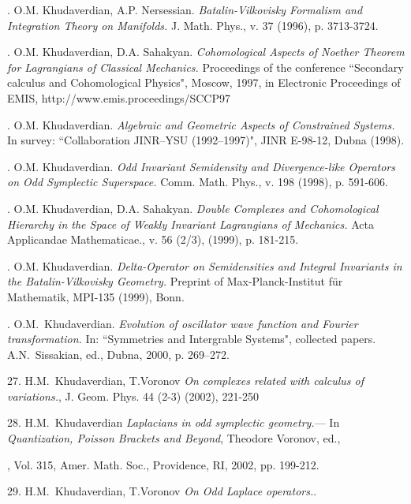 \documentclass[12pt]{article}
\begin{document}
. O.M. Khudaverdian, A.P. Nersessian.
 {\it Batalin-Vilkovisky Formalism and
  Integration Theory on Manifolds.}
  J. Math. Phys., v. 37 (1996), p. 3713-3724.

.  O.M. Khudaverdian, D.A. Sahakyan.
 {\it Cohomological Aspects of Noether Theorem
 for Lagrangians of Classical Mechanics.}
   Proceedings of the conference
   ``Secondary calculus and Cohomological Physics",
    Moscow, 1997, in
   Electronic Proceedings of EMIS,
   http://www.emis.proceedings/SCCP97

.   O.M. Khudaverdian. {\it Algebraic and Geometric Aspects
  of Constrained Systems.} In  survey:
   ``Collaboration JINR--YSU (1992--1997)", JINR E-98-12, Dubna (1998).

. O.M. Khudaverdian. {\it Odd Invariant Semidensity and
Divergence-like Operators on  Odd Symplectic Superspace.}
 Comm. Math. Phys., v. 198 (1998), p. 591-606.

. O.M. Khudaverdian, D.A. Sahakyan.
  {\it Double Complexes and Cohomological Hierarchy
  in the Space of Weakly Invariant Lagrangians of Mechanics.}
  Acta Applicandae Mathematicae., v. 56 (2/3), (1999), p. 181-215.

. O.M. Khudaverdian.
  {\it Delta-Operator on Semidensities and Integral
  Invariants in the Batalin-Vilkovisky Geometry.}
   Preprint of Max-Planck-Institut f\"ur Mathematik,
   MPI-135 (1999), Bonn.

. O.M.~Khudaverdian.
{\it Evolution of oscillator wave function and Fourier
transformation.} In: ``Symmetries and Intergrable Systems",
collected papers.  A.N.~Sissakian, ed., Dubna, 2000, p. 269--272.


\medskip

 27. H.M.~Khudaverdian, T.Voronov
  {\it On complexes related with calculus of variations.},
  { J. Geom. Phys.} 44 (2-3) (2002),
  221-250 %

\medskip

   28.  H.M.~Khudaverdian
   {\it Laplacians in odd symplectic geometry.}---
  In {\it Quantization, Poisson Brackets and Beyond},
  Theodore Voronov, ed.,

  , Vol. 315, Amer. Math. Soc.,
    Providence, RI, 2002, pp. 199-212.





\medskip

29.  H.M.~Khudaverdian, T.Voronov
  {\it On Odd Laplace operators.}.
\end{document}
